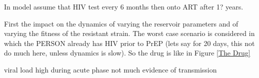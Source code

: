 \documentclass[DIV=15]{scrartcl}
\begin{document}



\iffalse










In model assume that HIV test every 6 months then onto ART after 1?  years.



First the impact on the dynamics of varying the reservoir parameters and of varying the  fitness of the resistant strain. The worst case scenario is considered in which the PERSON already has HIV prior to PrEP (lets say for 20 days, this not do much here, unless dynamics is slow). So the drug is like in Figure \ref{The Drug}















\iffalse
 viral load high during acute phase not much evidence of transmission 
\end{document}

